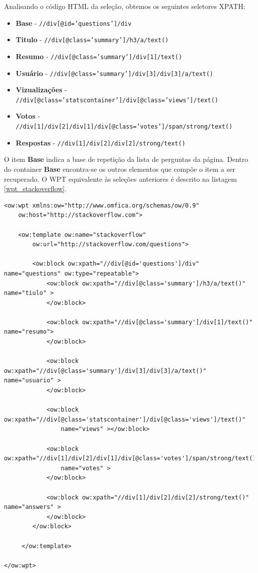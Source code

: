 Analisando o código HTML da seleção, obtemos os seguintes seletores XPATH:

\begin{itemize}
	\item \textbf{Base} - \texttt{//div[@id='questions']/div}
	\item \textbf{Titulo} - \texttt{//div[@class='summary']/h3/a/text()}
	\item \textbf{Resumo} - \texttt{//div[@class='summary']/div[1]/text()}
	\item \textbf{Usuário} - \texttt{//div[@class='summary']/div[3]/div[3]/a/text()}
	\item \textbf{Vizualizações} - \texttt{//div[@class='statscontainer']/div[@class='views']/text()}
	\item \textbf{Votos} - \texttt{//div[1]/div[2]/div[1]/div[@class='votes']/span/strong/text()}
	\item \textbf{Respostas} - \texttt{//div[1]/div[2]/div[2]/strong/text()}
\end{itemize}

O item \textbf{Base} indica a base de repetição da lista de perguntas da página. Dentro do container \textbf{Base} encontra-se os outros elementos que compõe o item a ser recuperado. O WPT equivalente às seleções anteriores é descrito na listagem \ref{wpt_stackoverflow}.

\begin{lstlisting}[label=wpt_stackoverflow]
<ow:wpt xmlns:ow="http://www.omfica.org/schemas/ow/0.9"
    ow:host="http://stackoverflow.com">
      
    <ow:template ow:name="stackoverflow" 
        ow:url="http://stackoverflow.com/questions">
       
        <ow:block ow:xpath="//div[@id='questions']/div" name="questions" ow:type="repeatable"> 
            <ow:block ow:xpath="//div[@class='summary']/h3/a/text()" name="tiulo" >
            </ow:block>
            
            <ow:block ow:xpath="//div[@class='summary']/div[1]/text()" name="resumo"> 
            </ow:block>
            
            <ow:block ow:xpath="//div[@class='summary']/div[3]/div[3]/a/text()" name="usuario" >
            </ow:block>

            <ow:block ow:xpath="//div[@class='statscontainer']/div[@class='views']/text()" 
                name="views" ></ow:block>

            <ow:block ow:xpath="//div[1]/div[2]/div[1]/div[@class='votes']/span/strong/text()" 
                name="votes" >
            </ow:block>

            <ow:block ow:xpath="//div[1]/div[2]/div[2]/strong/text()" name="answers" >
            </ow:block>
        </ow:block>
              
     </ow:template> 

</ow:wpt>
\end{lstlisting}

